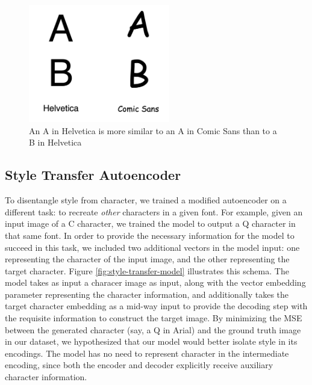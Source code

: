 \begin{figure}[H]
    \centering
    \includegraphics[width=0.55\textwidth]{images/ab-cs-helvetica.png}
    \caption{An { A} in Helvetica is more similar to an { A} in Comic Sans than to a { B} in Helvetica}
    \label{fig:ab-cs-helvetica}
\end{figure}

\subsection{Style Transfer Autoencoder} \label{style-transfer}

To disentangle style from character, we trained a modified autoencoder on a different task: to recreate \textit{other} characters in a given font. For example, given an input image of a C character, we trained the model to output a Q character in that same font. In order to provide the necessary information for the model to succeed in this task, we included two additional vectors in the model input: one representing the character of the input image, and the other representing the target character. Figure \ref{fig:style-transfer-model} illustrates this schema. The model takes as input a characer image as input, along with the vector embedding parameter representing the character information, and additionally takes the target character embedding as a mid-way input to provide the decoding step with the requisite information to construct the target image. By minimizing the MSE between the generated character (say, a { Q} in Arial) and the ground truth image in our dataset, we hypothesized that our model would better isolate style in its encodings. The model has no need to represent character in the intermediate encoding, since both the encoder and decoder explicitly receive auxiliary character information. 

